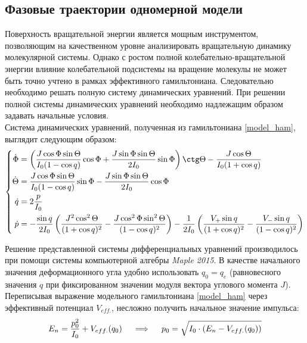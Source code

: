 \subsection{Фазовые траектории одномерной модели}

Поверхность вращательной энергии является мощным инструментом, позволяющим на качественном уровне анализировать вращательную динамику молекулярной системы. Однако с ростом полной колебательно-вращательной энергии влияние колебательной подсистемы на вращение молекулы не может быть точно учтено в рамках эффективного гамильтониана. Следовательно необходимо решать полную систему динамических уравнений. При решении полной системы динамических уравнений необходимо надлежащим образом задавать начальные условия. \\

Система динамических уравнений, полученная из гамильтониана \eqref{model_ham}, выглядит следующим образом:
\vverh
\begin{gather}
\left\{
\begin{aligned}
\dot{\Phi} &= \left( \frac{J \cos \Phi \sin \Theta}{I_0 ( 1 - \cos q)} \cos \Phi + \frac{J \sin \Phi \sin \Theta}{2I_0} \sin \Phi \right) \ctg \Theta - \frac{J \cos \Theta}{I_0 (1 + \cos q)} \\
\dot{\Theta} &= \frac{J \cos \Phi \sin \Theta}{I_0 (1 - \cos q)} \sin \Phi - \frac{J \sin \Phi \sin \Theta}{2I_0} \cos \Phi \\
\dot{q} &= 2	\frac{p}{I_0} \\
\dot{p} &= - \frac{\sin q}{2I_0} \left( \frac{J^2 \cos^2 \Theta}{(1 + \cos q)^2} - \frac{J \cos^2 \Phi \sin^2 \Theta}{(1 - \cos q)^2} \right) - \frac{1}{2I_0} \left( \frac{V_{+} \sin q}{(1 + \cos q)^2} - \frac{V_{-} \sin q}{(1 - \cos q)^2} \right)
\end{aligned}
\right. \notag
\end{gather}

Решение представленной системы дифференциальных уравнений производилось при помощи системы компьютерной алгебры \textit{Maple 2015}. В качестве начального значения деформационного угла удобно использовать $q_0 = q_e$ (равновесного значения $q$ при фиксированном значении модуля вектора углового момента $J$). Переписывая выражение модельного гамильтониана \eqref{model_ham} через эффективный потенциал $V_{eff.}$, несложно получить начальное значение импульса:
\vverh
\begin{gather}
E_n = \frac{p_0^2}{I_0} + V_{eff.} (q_0) \quad \implies \quad p_0 = \sqrt{I_0 \cdot \left( E_n - V_{eff.} (q_0) \right) } \notag
\end{gather}

